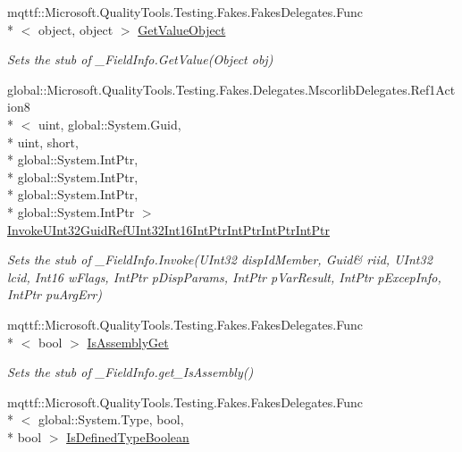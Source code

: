 \begin{DoxyCompactItemize}
mqttf\-::\-Microsoft.\-Quality\-Tools.\-Testing.\-Fakes.\-Fakes\-Delegates.\-Func\\*
$<$ object, object $>$ \hyperlink{class_system_1_1_runtime_1_1_interop_services_1_1_fakes_1_1_stub___field_info_a4e884911f9397c76ee1571fc976fdc85}{Get\-Value\-Object}
\begin{DoxyCompactList}\small\item\em Sets the stub of \-\_\-\-Field\-Info.\-Get\-Value(\-Object obj)\end{DoxyCompactList}\item 
global\-::\-Microsoft.\-Quality\-Tools.\-Testing.\-Fakes.\-Delegates.\-Mscorlib\-Delegates.\-Ref1\-Action8\\*
$<$ uint, global\-::\-System.\-Guid, \\*
uint, short, \\*
global\-::\-System.\-Int\-Ptr, \\*
global\-::\-System.\-Int\-Ptr, \\*
global\-::\-System.\-Int\-Ptr, \\*
global\-::\-System.\-Int\-Ptr $>$ \hyperlink{class_system_1_1_runtime_1_1_interop_services_1_1_fakes_1_1_stub___field_info_a998f29deca8e5b221df9fb69d0bc66cf}{Invoke\-U\-Int32\-Guid\-Ref\-U\-Int32\-Int16\-Int\-Ptr\-Int\-Ptr\-Int\-Ptr\-Int\-Ptr}
\begin{DoxyCompactList}\small\item\em Sets the stub of \-\_\-\-Field\-Info.\-Invoke(U\-Int32 disp\-Id\-Member, Guid\& riid, U\-Int32 lcid, Int16 w\-Flags, Int\-Ptr p\-Disp\-Params, Int\-Ptr p\-Var\-Result, Int\-Ptr p\-Excep\-Info, Int\-Ptr pu\-Arg\-Err)\end{DoxyCompactList}\item 
mqttf\-::\-Microsoft.\-Quality\-Tools.\-Testing.\-Fakes.\-Fakes\-Delegates.\-Func\\*
$<$ bool $>$ \hyperlink{class_system_1_1_runtime_1_1_interop_services_1_1_fakes_1_1_stub___field_info_add236e91de9e185ad7f54ccf6b784ee2}{Is\-Assembly\-Get}
\begin{DoxyCompactList}\small\item\em Sets the stub of \-\_\-\-Field\-Info.\-get\-\_\-\-Is\-Assembly()\end{DoxyCompactList}\item 
mqttf\-::\-Microsoft.\-Quality\-Tools.\-Testing.\-Fakes.\-Fakes\-Delegates.\-Func\\*
$<$ global\-::\-System.\-Type, bool, \\*
bool $>$ \hyperlink{class_system_1_1_runtime_1_1_interop_services_1_1_fakes_1_1_stub___field_info_a8e2b9c39392b55c822ea167ec1fcb003}{Is\-Defined\-Type\-Boolean}

\end{DoxyCompactItemize}
